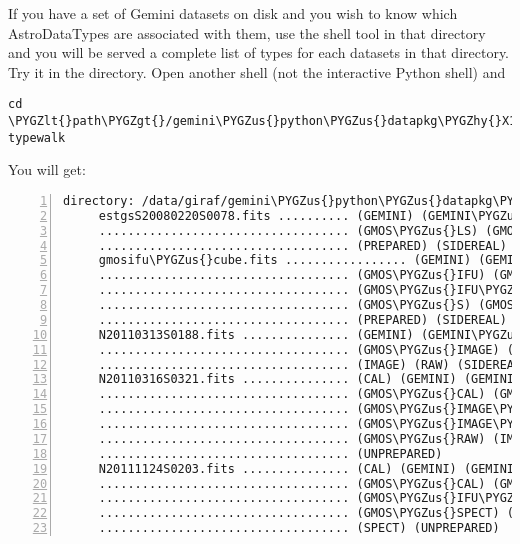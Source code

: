 \documentclass[letterpaper,10pt,english]{sphinxmanual}
\def\PYGZus{\char`\_}
\def\PYGZlt{\char`\<}
\def\PYGZgt{\char`\>}
\def\PYGZhy{\char`\-}
\begin{document}
If you have a set of Gemini datasets on disk and you wish to know which
AstroDataTypes are associated with them, use the shell tool 
in that directory and you will be served a complete list of types for each
datasets in that directory.  Try it in the 
directory.  Open another shell (not the interactive Python shell) and

\begin{Verbatim}[commandchars=\\\{\}]
cd \PYGZlt{}path\PYGZgt{}/gemini\PYGZus{}python\PYGZus{}datapkg\PYGZhy{}X1/data\PYGZus{}for\PYGZus{}ad\PYGZus{}user\PYGZus{}manual
typewalk
\end{Verbatim}

You will get:

\begin{Verbatim}[commandchars=\\\{\},numbers=left,firstnumber=1,stepnumber=1]
directory: /data/giraf/gemini\PYGZus{}python\PYGZus{}datapkg\PYGZhy{}X1/data\PYGZus{}for\PYGZus{}ad\PYGZus{}user\PYGZus{}manual
     estgsS20080220S0078.fits .......... (GEMINI) (GEMINI\PYGZus{}SOUTH) (GMOS)
     ................................... (GMOS\PYGZus{}LS) (GMOS\PYGZus{}S) (GMOS\PYGZus{}SPECT) (LS)
     ................................... (PREPARED) (SIDEREAL) (SPECT)
     gmosifu\PYGZus{}cube.fits ................. (GEMINI) (GEMINI\PYGZus{}SOUTH) (GMOS)
     ................................... (GMOS\PYGZus{}IFU) (GMOS\PYGZus{}IFU\PYGZus{}BLUE)
     ................................... (GMOS\PYGZus{}IFU\PYGZus{}RED) (GMOS\PYGZus{}IFU\PYGZus{}TWO)
     ................................... (GMOS\PYGZus{}S) (GMOS\PYGZus{}SPECT) (IFU)
     ................................... (PREPARED) (SIDEREAL) (SPECT)
     N20110313S0188.fits ............... (GEMINI) (GEMINI\PYGZus{}NORTH) (GMOS)
     ................................... (GMOS\PYGZus{}IMAGE) (GMOS\PYGZus{}N) (GMOS\PYGZus{}RAW)
     ................................... (IMAGE) (RAW) (SIDEREAL) (UNPREPARED)
     N20110316S0321.fits ............... (CAL) (GEMINI) (GEMINI\PYGZus{}NORTH) (GMOS)
     ................................... (GMOS\PYGZus{}CAL) (GMOS\PYGZus{}IMAGE)
     ................................... (GMOS\PYGZus{}IMAGE\PYGZus{}FLAT)
     ................................... (GMOS\PYGZus{}IMAGE\PYGZus{}TWILIGHT) (GMOS\PYGZus{}N)
     ................................... (GMOS\PYGZus{}RAW) (IMAGE) (RAW) (SIDEREAL)
     ................................... (UNPREPARED)
     N20111124S0203.fits ............... (CAL) (GEMINI) (GEMINI\PYGZus{}NORTH) (GMOS)
     ................................... (GMOS\PYGZus{}CAL) (GMOS\PYGZus{}IFU) (GMOS\PYGZus{}IFU\PYGZus{}FLAT)
     ................................... (GMOS\PYGZus{}IFU\PYGZus{}RED) (GMOS\PYGZus{}N) (GMOS\PYGZus{}RAW)
     ................................... (GMOS\PYGZus{}SPECT) (IFU) (RAW) (SIDEREAL)
     ................................... (SPECT) (UNPREPARED)
\end{Verbatim}
\end{document}
